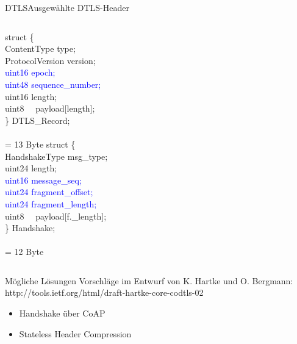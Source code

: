 \documentclass{beamer}
\begin{document}
\begin{frame}{DTLS}{Ausgewählte DTLS-Header}
  \begin{columns}
      struct \{\\
      \qquad ContentType type;\\
      \qquad ProtocolVersion version;\\
      \qquad \textcolor{blue}{uint16 epoch;}\\
      \qquad \textcolor{blue}{uint48 sequence\_number;}\\
      \qquad uint16 length;\\
      \qquad uint8 ~~payload[length];\\
      \} DTLS\_Record;\\
      ~\\
      = 13 Byte
      struct \{\\
      \qquad HandshakeType msg\_type;\\
      \qquad uint24 length;\\
      \qquad \textcolor{blue}{uint16 message\_seq;}\\
      \qquad \textcolor{blue}{uint24 fragment\_offset;}\\
      \qquad \textcolor{blue}{uint24 fragment\_length;}\\
      \qquad uint8 ~~payload[f.\_length];\\
      \} Handshake;\\
      ~\\
      = 12 Byte
  \end{columns}
\end{frame}

\begin{frame}{Mögliche Lösungen}
  Vorschläge im Entwurf von K. Hartke und O. Bergmann:\\
  http://tools.ietf.org/html/draft-hartke-core-codtls-02\\
  \begin{itemize}
    \item Handshake über CoAP
    \item Stateless Header Compression
  \end{itemize}
\end{frame}
\end{document}
